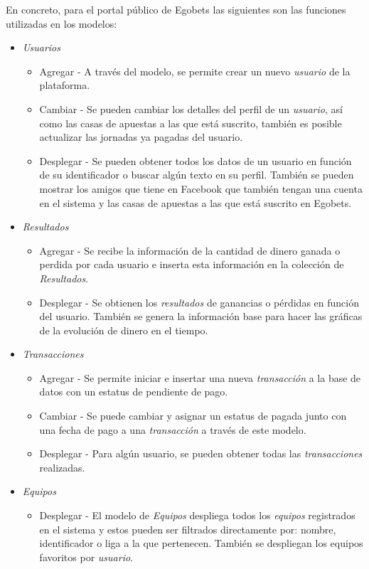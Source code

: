 		En concreto, para el portal público de Egobets las siguientes son las funciones utilizadas en los modelos:
		\begin{itemize}
			\item \emph{Usuarios}
				\begin{itemize}
					\item Agregar - A través del modelo, se permite crear un nuevo \emph{usuario} de la plataforma.
					\item Cambiar - Se pueden cambiar los detalles del perfil de un \emph{usuario}, así como las casas de apuestas a las que está suscrito, también es posible actualizar las jornadas ya pagadas del usuario.
					\item Desplegar - Se pueden obtener todos los datos de un usuario en función de su identificador o buscar algún texto en su perfil. También se pueden mostrar los amigos que tiene en Facebook \cite{facebookDocuWeb} que también tengan una cuenta en el sistema y las casas de apuestas a las que está suscrito en Egobets.
				\end{itemize}
			\item \emph{Resultados}
			\begin{itemize}
				\item Agregar - Se recibe la información de la cantidad de dinero ganada o perdida por cada usuario e inserta esta información en la colección de \emph{Resultados}.
				\item Desplegar - Se obtienen los \emph{resultados} de ganancias o pérdidas en función del usuario. También se genera la información base para hacer las gráficas de la evolución de dinero en el tiempo.
			\end{itemize}
			\item \emph{Transacciones}
				\begin{itemize}
					\item Agregar - Se permite iniciar e insertar una nueva \emph{transacción} a la base de datos con un estatus de pendiente de pago.
					\item Cambiar - Se puede cambiar y asignar un estatus de pagada junto con una fecha de pago a una \emph{transacción} a través de este modelo.
					\item Desplegar - Para algún usuario, se pueden obtener todas las \emph{transacciones} realizadas.
				\end{itemize}
			\item \emph{Equipos}
				\begin{itemize}
					\item Desplegar - El modelo  de \emph{Equipos} despliega todos los \emph{equipos} registrados en el sistema y estos pueden ser filtrados directamente por: nombre, identificador o liga a la que pertenecen. También se despliegan los equipos favoritos por \emph{usuario}.

\end{itemize}
\end{itemize}
